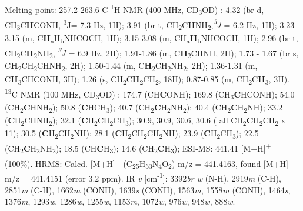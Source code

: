 Melting point: 257.2-263.6 \textdegree C
\newline
\textsuperscript{1}H NMR (400 MHz, CD\textsubscript{3}OD) \textdelta: 4.32 (br d, CH\textsubscript{3}C\textbf{H}CONH, \textsuperscript{3}J= 7.3 Hz,  1H); 3.91 (br t,   CH\textsubscript{2}C\textbf{H}NH\textsubscript{2},\textit{\textsuperscript{3}J} = 6.2 Hz, 1H); 3.23-3.15 (m, C\textbf{H}\textsubscript{a}H\textsubscript{b}NHCOCH, 1H); 3.15-3.08 (m, CH\textsubscript{a}\textbf{H}\textsubscript{b}NHCOCH, 1H); 2.96 (br t, CH\textsubscript{2}C\textbf{H}\textsubscript{2}NH\textsubscript{2}, \textit{\textsuperscript{3}J} = 6.9 Hz, 2H); 1.91-1.86 (m, C\textbf{H}\textsubscript{2}CHNH, 2H); 1.73 - 1.67 (br s, C\textbf{H}\textsubscript{2}CH\textsubscript{2}CHNH\textsubscript{2}, 2H); 1.50-1.44 (m, C\textbf{H}\textsubscript{2}CH\textsubscript{2}NH\textsubscript{2}, 2H); 1.36-1.31 (m, C\textbf{H}\textsubscript{3}CHCONH, 3H); 1.26 (s, CH\textsubscript{2}C\textbf{H}\textsubscript{2}CH\textsubscript{2}, 18H);  0.87-0.85 (m, CH\textsubscript{2}C\textbf{H}\textsubscript{3}, 3H).
\newline
\textsuperscript{13}C NMR (100 MHz, CD\textsubscript{3}OD) \textdelta:
174.7 (CH\textbf{C}ONH); 169.8 (CH\textsubscript{3}\textbf{C}HCONH); 54.0 (CH\textsubscript{2}\textbf{C}HNH\textsubscript{2}); 50.8 (\textbf{C}HCH\textsubscript{3}); 40.7 (CH\textsubscript{2}\textbf{C}H\textsubscript{2}NH\textsubscript{2}); 40.4 (CH\textsubscript{2}\textbf{C}H\textsubscript{2}NH); 33.2 (\textbf{C}H\textsubscript{2}CHNH\textsubscript{2}); 32.1 (\textbf{C}H\textsubscript{2}CH\textsubscript{2}CH\textsubscript{3}); 30.9, 30.9, 30.6, 30.6 ( all CH\textsubscript{2}\textbf{C}H\textsubscript{2}CH\textsubscript{2} x 11); 30.5 (\textbf{C}H\textsubscript{2}CH\textsubscript{2}NH); 28.1 (\textbf{C}H\textsubscript{2}CH\textsubscript{2}CH\textsubscript{2}NH); 23.9 (\textbf{C}H\textsubscript{2}CH\textsubscript{3}); 22.5 (CH\textsubscript{2}\textbf{C}H\textsubscript{2}NH\textsubscript{2}); 18.5 (CH\textbf{C}H\textsubscript{3}); 14.6 (CH\textsubscript{2}\textbf{C}H\textsubscript{3});  
\newline
ESI-MS: 441.41 [M+H]\textsuperscript{+} (100\%).
\newline
HRMS: Calcd. [M+H]\textsuperscript{+} (C\textsubscript{25}H\textsubscript{53}N\textsubscript{4}O\textsubscript{2}) m/z = 441.4163, found [M+H]\textsuperscript{+} m/z = 441.4151 (error 3.2 ppm).
\newline
IR \textit{v} [cm\textsuperscript{-1}]: 3392\textit{br w} (N-H), 2919\textit{m} (C-H), 2851\textit{m} (C-H), 1662\textit{m} (CONH), 1639\textit{s} (CONH), 1563\textit{m}, 1558\textit{m} (CONH), 1464\textit{s}, 1376\textit{m}, 1293\textit{w}, 1286\textit{w}, 1255\textit{w}, 1153\textit{m}, 1072\textit{w}, 976\textit{w}, 948\textit{w}, 888\textit{w}.    
\newpage
